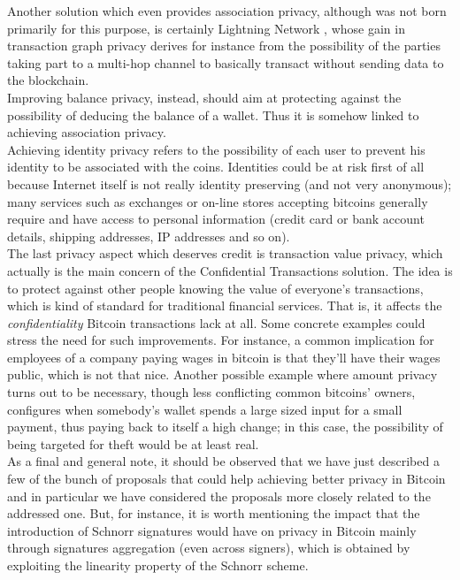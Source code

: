 Another solution which even provides association privacy, although was not born primarily for this purpose, is certainly Lightning Network \cite{RefWork:18}, whose gain in transaction graph privacy derives for instance from the possibility of the parties taking part to a multi-hop channel to basically transact without sending data to the blockchain. \\ 
Improving balance privacy, instead, should aim at protecting against the possibility of deducing the balance of a wallet. Thus it is somehow linked to achieving association privacy.\\
Achieving identity privacy refers to the possibility of each user to prevent his identity to be associated with the coins. Identities could be at risk first of all because Internet itself is not really identity preserving (and not very anonymous); many services such as exchanges or on-line stores accepting bitcoins generally require and have access to personal information (credit card or bank account details, shipping addresses, IP addresses and so on).\\
The last privacy aspect which deserves credit is transaction value privacy, which actually is the main concern of the Confidential Transactions \cite{Max15} solution. The idea is to protect against other people knowing the value of everyone's transactions, which is kind of standard for traditional financial services. That is, it affects the \textit{confidentiality} Bitcoin transactions lack at all. Some concrete examples could stress the need for such improvements. For instance, a common implication for employees of a company paying wages in bitcoin is that they'll have their wages public, which is not that nice. Another possible example where amount privacy turns out to be necessary, though less conflicting common bitcoins' owners, configures when somebody's wallet spends a large sized input for a small payment, thus paying back to itself a high change; in this case, the possibility of being targeted for theft would be at least real.\\
As a final and general note, it should be observed that we have just described a few of the bunch of proposals that could help achieving better privacy in Bitcoin and in particular we have considered the proposals more closely related to the addressed one. But, for instance, it is worth mentioning the impact that the introduction of Schnorr signatures \cite{Schnorr} would have on privacy in Bitcoin mainly through signatures aggregation (even across signers), which is obtained by exploiting the linearity property of the Schnorr scheme.

